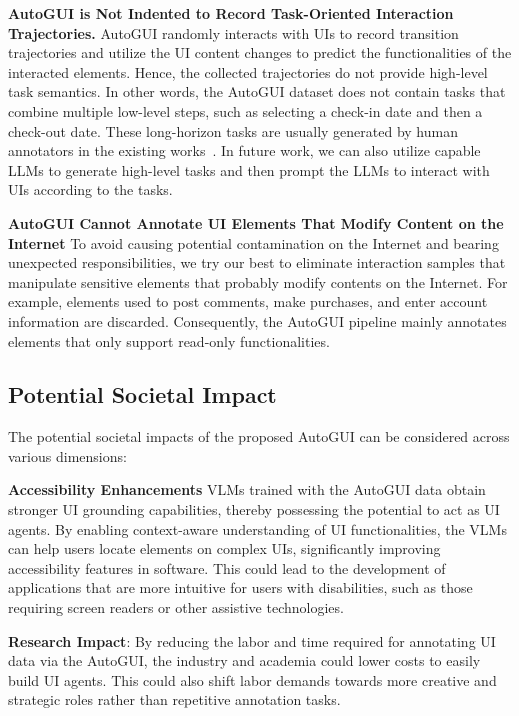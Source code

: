 \noindent\textbf{AutoGUI is Not Indented to Record Task-Oriented Interaction Trajectories.} AutoGUI randomly interacts with UIs to record transition trajectories and utilize the UI content changes to predict the functionalities of the interacted elements. Hence, the collected trajectories do not provide high-level task semantics. In other words, the AutoGUI dataset does not contain tasks that combine multiple low-level steps, such as selecting a check-in date and then a check-out date. These long-horizon tasks are usually generated by human annotators in the existing works~\cite{deng2024mind2web,rawles2023android}. In future work, we can also utilize capable LLMs to generate high-level tasks and then prompt the LLMs to interact with UIs according to the tasks.

\noindent\textbf{AutoGUI Cannot Annotate UI Elements That Modify Content on the Internet} To avoid causing potential contamination on the Internet and bearing unexpected responsibilities, we try our best to eliminate interaction samples that manipulate sensitive elements that probably modify contents on the Internet. For example, elements used to post comments, make purchases, and enter account information are discarded. Consequently, the AutoGUI pipeline mainly annotates elements that only support read-only functionalities.

\subsection{Potential Societal Impact}
The potential societal impacts of the proposed AutoGUI can be considered across various dimensions:

\noindent\textbf{Accessibility Enhancements} VLMs trained with the AutoGUI data obtain stronger UI grounding capabilities, thereby possessing the potential to act as UI agents. By enabling context-aware understanding of UI functionalities, the VLMs can help users locate elements on complex UIs, significantly improving accessibility features in software. This could lead to the development of applications that are more intuitive for users with disabilities, such as those requiring screen readers or other assistive technologies.


\noindent\textbf{Research Impact}: By reducing the labor and time required for annotating UI data via the AutoGUI, the industry and academia could lower costs to easily build UI agents. This could also shift labor demands towards more creative and strategic roles rather than repetitive annotation tasks.

